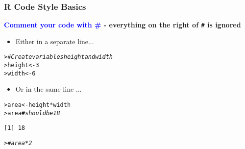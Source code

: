 \documentclass[13pt,aspectratio=169]{beamer}\usepackage[]{graphicx}\usepackage[]{color}
\makeatletter
\newcommand{\hlnum}[1]{\textcolor[rgb]{0.686,0.059,0.569}{#1}}%
\newcommand{\hlcom}[1]{\textcolor[rgb]{0.678,0.584,0.686}{\textit{#1}}}%
\newcommand{\hlopt}[1]{\textcolor[rgb]{0,0,0}{#1}}%
\newcommand{\hlstd}[1]{\textcolor[rgb]{0.345,0.345,0.345}{#1}}%
\newcommand{\hlkwb}[1]{\textcolor[rgb]{0.69,0.353,0.396}{#1}}%
\newenvironment{kframe}{%
 \def\at@end@of@kframe{}%
 \ifinner\ifhmode%
  \def\at@end@of@kframe{\end{minipage}}%
  \begin{minipage}{\columnwidth}%
 \fi\fi%
 \def\FrameCommand##1{\hskip\@totalleftmargin \hskip-\fboxsep
 \colorbox{shadecolor}{##1}\hskip-\fboxsep
     \hskip-\linewidth \hskip-\@totalleftmargin \hskip\columnwidth}%
 \MakeFramed {\advance\hsize-\width
   \@totalleftmargin\z@ \linewidth\hsize
   \@setminipage}}%
 {\par\unskip\endMakeFramed%
 \at@end@of@kframe}
\newenvironment{knitrout}{}{} %
\newcommand{\tc}[2]{\textcolor{#1}{#2}}
\renewcommand{\tt}[1]{\texttt{#1}}
\renewenvironment{knitrout}{\setlength{\topsep}{0mm}}{}
\makeatother
\begin{document}
\begin{frame}[fragile]
    \frametitle{R Code Style Basics}
    \textbf{\tc{Blue}{Comment your code with \#} -
	everything on the right
	of \tt{\#} is ignored}
    \begin{itemize}
	\item Either in a \alert{separate line}...
    \end{itemize}

\begin{knitrout}\small
{}\color{fgcolor}\begin{kframe}
\begin{alltt}
\hlstd{> }\hlcom{# Create variables height and width}
\hlstd{> }\hlstd{height} \hlkwb{<-} \hlnum{3}
\hlstd{> }\hlstd{width} \hlkwb{<-} \hlnum{6}
\end{alltt}
\end{kframe}
\end{knitrout}
    \begin{itemize}
	\item Or in the \alert{same line} ...
    \end{itemize}

\begin{knitrout}\small
{}\color{fgcolor}\begin{kframe}
\begin{alltt}
\hlstd{> }\hlstd{area} \hlkwb{<-} \hlstd{height} \hlopt{*} \hlstd{width}
\hlstd{> }\hlstd{area} \hlcom{# should be 18}
\end{alltt}
\begin{verbatim}
[1] 18
\end{verbatim}
\begin{alltt}
\hlstd{> }\hlcom{# area * 2}
\end{alltt}
\end{kframe}
\end{knitrout}

\end{frame}
\end{document}
